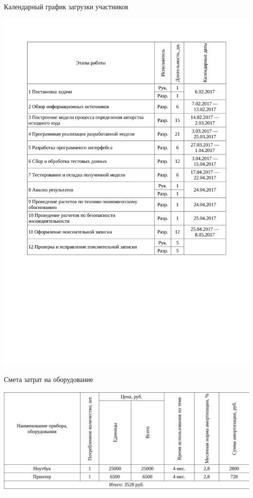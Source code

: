 \begin{table}[!ht]
\caption{Календарный график загрузки участников}
\centering
\includegraphics[page=1, width=1\linewidth]{schedule_3.pdf}
\label{tab:job_is_done_3}
\end{table}

\begin{table}[!ht]
\caption{Смета затрат на оборудование}
\centering
\includegraphics[page=1, width=1\linewidth]{schedule_4.pdf}
\label{tab:job_is_done_4}
\end{table}


